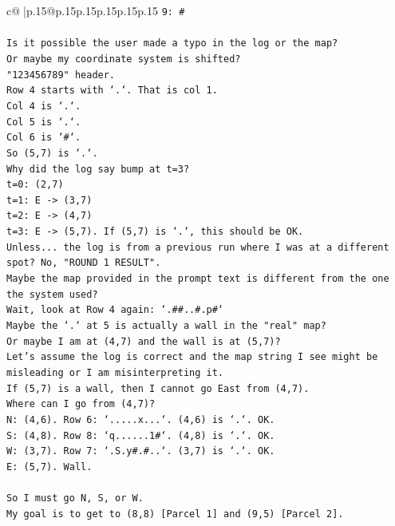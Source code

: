 \documentclass{article}
\begin{document}
{\begin{supertabular}{c@{$\;$}|p{.15\linewidth}@{}p{.15\linewidth}p{.15\linewidth}p{.15\linewidth}p{.15\linewidth}p{.15\linewidth}}
{{{\texttt{9: \#} \\
\\ 
\texttt{Is it possible the user made a typo in the log or the map?} \\
\texttt{Or maybe my coordinate system is shifted?} \\
\texttt{"123456789" header.} \\
\texttt{Row 4 starts with `.`. That is col 1.} \\
\texttt{Col 4 is `.`.} \\
\texttt{Col 5 is `.`.} \\
\texttt{Col 6 is `\#`.} \\
\texttt{So (5,7) is `.`.} \\
\texttt{Why did the log say bump at t=3?} \\
\texttt{t=0: (2,7)} \\
\texttt{t=1: E {-}> (3,7)} \\
\texttt{t=2: E {-}> (4,7)} \\
\texttt{t=3: E {-}> (5,7). If (5,7) is `.`, this should be OK.} \\
\texttt{Unless... the log is from a previous run where I was at a different spot? No, "ROUND 1 RESULT".} \\
\texttt{Maybe the map provided in the prompt text is different from the one the system used?} \\
\texttt{Wait, look at Row 4 again: `.\#\#..\#.p\#`} \\
\texttt{Maybe the `.` at 5 is actually a wall in the "real" map?} \\
\texttt{Or maybe I am at (4,7) and the wall is at (5,7)?} \\
\texttt{Let's assume the log is correct and the map string I see might be misleading or I am misinterpreting it.} \\
\texttt{If (5,7) is a wall, then I cannot go East from (4,7).} \\
\texttt{Where can I go from (4,7)?} \\
\texttt{N: (4,6). Row 6: `.....x...`. (4,6) is `.`. OK.} \\
\texttt{S: (4,8). Row 8: `q......1\#`. (4,8) is `.`. OK.} \\
\texttt{W: (3,7). Row 7: `.S.y\#.\#..`. (3,7) is `.`. OK.} \\
\texttt{E: (5,7). Wall.} \\
\\ 
\texttt{So I must go N, S, or W.} \\
\texttt{My goal is to get to (8,8) {[}Parcel 1{]} and (9,5) {[}Parcel 2{]}.} \\
}}}
\end{supertabular}}
\end{document}
